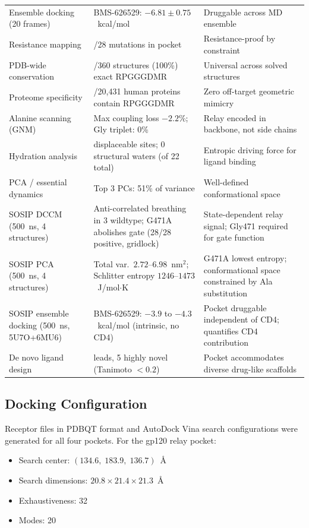 \documentclass[11pt,a4paper]{article}
\begin{document}
\begin{table}[htbp]
\begin{tabularx}{\textwidth}{@{}p{4.0cm} >{\raggedright\arraybackslash}X >{\raggedright\arraybackslash}X@{}}
Ensemble docking (20 frames) & BMS-626529: $-6.81 \pm 0.75$~kcal/mol & Druggable across MD ensemble \\
Resistance mapping & 0/28 mutations in pocket & Resistance-proof by constraint \\
PDB-wide conservation & 360/360 structures (100\%) exact RPGGGDMR & Universal across solved structures \\
Proteome specificity & 0/20,431 human proteins contain RPGGGDMR & Zero off-target geometric mimicry \\
Alanine scanning (GNM) & Max coupling loss $-2.2$\%; Gly triplet: 0\% & Relay encoded in backbone, not side chains \\
Hydration analysis & 8 displaceable sites; 0 structural waters (of 22 total) & Entropic driving force for ligand binding \\
PCA / essential dynamics & Top 3 PCs: 51\% of variance & Well-defined conformational space \\
SOSIP DCCM (500~ns, 4 structures) & Anti-correlated breathing in 3 wildtype; G471A abolishes gate (28/28 positive, gridlock) & State-dependent relay signal; Gly471 required for gate function \\
SOSIP PCA (500~ns, 4 structures) & Total var.\ $2.72$--$6.98$~nm$^2$; Schlitter entropy $1246$--$1473$~J/mol$\cdot$K & G471A lowest entropy; conformational space constrained by Ala substitution \\
SOSIP ensemble docking (500~ns, 5U7O+6MU6) & BMS-626529: $-3.9$ to $-4.3$~kcal/mol (intrinsic, no CD4) & Pocket druggable independent of CD4; quantifies CD4 contribution \\
De novo ligand design & 8 leads, 5 highly novel (Tanimoto $<0.2$) & Pocket accommodates diverse drug-like scaffolds \\
\bottomrule
\end{tabularx}
\end{table}

\subsection{Docking Configuration}

Receptor files in PDBQT format and AutoDock Vina search configurations were generated for all four pockets. For the gp120 relay pocket:

\begin{itemize}[nosep,leftmargin=1.5em]
    \item Search center: $(134.6,\; 183.9,\; 136.7)$~\AA
    \item Search dimensions: $20.8 \times 21.4 \times 21.3$~\AA
    \item Exhaustiveness: 32
    \item Modes: 20
\end{itemize}
\end{document}
